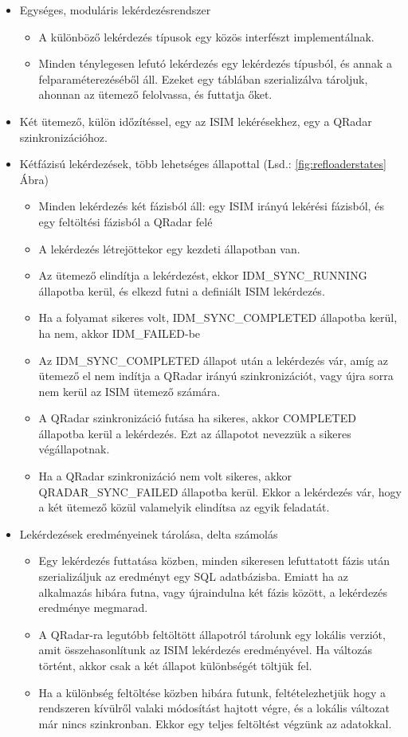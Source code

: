\begin{itemize}
	\item Egységes, moduláris lekérdezésrendszer
	\begin{itemize}
		\item A különböző lekérdezés típusok egy közös interfészt implementálnak.
		\item Minden ténylegesen lefutó lekérdezés egy lekérdezés típusból, és annak a felparaméterezéséből áll. Ezeket egy táblában szerializálva tároljuk, ahonnan az ütemező felolvassa, és futtatja őket.
	\end{itemize}
	
	\item Két ütemező, külön időzítéssel, egy az ISIM lekérésekhez, egy a QRadar szinkronizációhoz.
	
	\item Kétfázisú lekérdezések, több lehetséges állapottal (Lsd.: \ref{fig:refloaderstates} Ábra)
	\begin{itemize}
		\item Minden lekérdezés két fázisból áll: egy ISIM irányú lekérési fázisból, és egy feltöltési fázisból a QRadar felé
		\item A lekérdezés létrejöttekor egy kezdeti állapotban van.
		\item Az ütemező elindítja a lekérdezést, ekkor IDM\_SYNC\_RUNNING állapotba kerül, és elkezd futni a definiált ISIM lekérdezés.
		\item Ha a folyamat sikeres volt, IDM\_SYNC\_COMPLETED állapotba kerül, ha nem, akkor IDM\_FAILED-be
		\item Az IDM\_SYNC\_COMPLETED állapot után a lekérdezés vár, amíg az ütemező el nem indítja a QRadar irányú szinkronizációt, vagy újra sorra nem kerül az ISIM ütemező számára.
		\item A QRadar szinkronizáció futása ha sikeres, akkor COMPLETED állapotba kerül a lekérdezés. Ezt az állapotot nevezzük a sikeres végállapotnak.
		\item Ha a QRadar szinkronizáció nem volt sikeres, akkor QRADAR\_SYNC\_FAILED állapotba kerül. Ekkor a lekérdezés vár, hogy a két ütemező közül valamelyik elindítsa az egyik feladatát.
	\end{itemize}

	\item Lekérdezések eredményeinek tárolása, delta számolás
	\begin{itemize}
		\item Egy lekérdezés futtatása közben, minden sikeresen lefuttatott fázis után szerializáljuk az eredményt egy SQL adatbázisba. Emiatt ha az alkalmazás hibára futna, vagy újraindulna két fázis között, a lekérdezés eredménye megmarad.
		\item A QRadar-ra legutóbb feltöltött állapotról tárolunk egy lokális verziót, amit összehasonlítunk az ISIM lekérdezés eredményével. Ha változás történt, akkor csak a két állapot különbségét töltjük fel.
		\item Ha a különbség feltöltése közben hibára futunk, feltételezhetjük hogy a rendszeren kívülről valaki módosítást hajtott végre, és a lokális változat már nincs szinkronban. Ekkor egy teljes feltöltést végzünk az adatokkal.
	\end{itemize}


\end{itemize}
